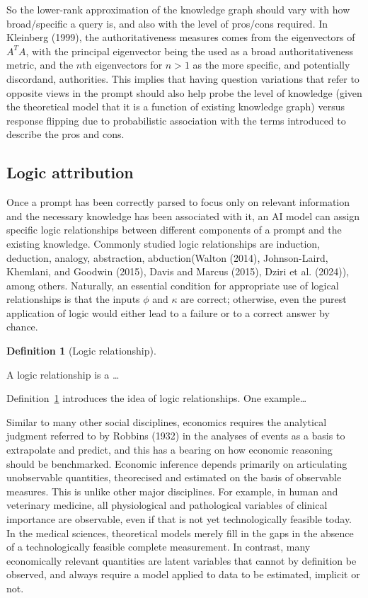 \documentclass[
]{article}
\theoremstyle{plain}
\theoremstyle{definition}
\newtheorem{definition}{Definition}[section]
\theoremstyle{remark}
\begin{document}
So the lower-rank approximation of the knowledge graph should vary with
how broad/specific a query is, and also with the level of pros/cons
required. In Kleinberg (1999), the authoritativeness measures comes from
the eigenvectors of \(A^TA\), with the principal eigenvector being the
used as a broad authoritativeness metric, and the \(n\)th eigenvectors
for \(n>1\) as the more specific, and potentially discordand,
authorities. This implies that having question variations that refer to
opposite views in the prompt should also help probe the level of
knowledge (given the theoretical model that it is a function of existing
knowledge graph) versus response flipping due to probabilistic
association with the terms introduced to describe the pros and cons.

\subsection{Logic attribution}\label{logic-attribution}

Once a prompt has been correctly parsed to focus only on relevant
information and the necessary knowledge has been associated with it, an
AI model can assign specific logic relationships between different
components of a prompt and the existing knowledge. Commonly studied
logic relationships are induction, deduction, analogy, abstraction,
abduction(Walton (2014), Johnson-Laird, Khemlani, and Goodwin (2015),
Davis and Marcus (2015), Dziri et al. (2024)), among others. Naturally,
an essential condition for appropriate use of logical relationships is
that the inputs \(\phi\) and \(\kappa\) are correct; otherwise, even the
purest application of logic would either lead to a failure or to a
correct answer by chance.

\begin{definition}[Logic
relationship]\protect\hypertarget{def-logic}{}\label{def-logic}

A logic relationship is a \ldots{}

\end{definition}

Definition~\ref{def-logic} introduces the idea of logic relationships.
One example\ldots{}

Similar to many other social disciplines, economics requires the
analytical judgment referred to by Robbins (1932) in the analyses of
events as a basis to extrapolate and predict, and this has a bearing on
how economic reasoning should be benchmarked. Economic inference depends
primarily on articulating unobservable quantities, theorecised and
estimated on the basis of observable measures. This is unlike other
major disciplines. For example, in human and veterinary medicine, all
physiological and pathological variables of clinical importance are
observable, even if that is not yet technologically feasible today. In
the medical sciences, theoretical models merely fill in the gaps in the
absence of a technologically feasible complete measurement. In contrast,
many economically relevant quantities are latent variables that cannot
by definition be observed, and always require a model applied to data to
be estimated, implicit or not.
\end{document}

